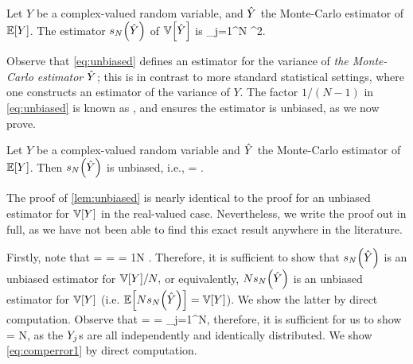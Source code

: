 Let $Y$ be a complex-valued random variable, and $\hat{Y}$ the Monte-Carlo estimator of $\EXP{Y}$. The estimator $\unbiased{\Yhat}{N}$ of $\VAR{\Yhat}$ is
\beq\label{eq:unbiased}
 \de {} \sum_{j=1}^N \abs{\Yj - \Yhat}^2.
\eeq
\ede

Observe that \cref{eq:unbiased} defines an estimator for the variance of \emph{the Monte-Carlo estimator $\hat{Y}$}; this is in contrast to more standard statistical settings, where one constructs an estimator of the variance of $Y$. The factor $1/(N-1)$ in \cref{eq:unbiased} is known as , and ensures the estimator is unbiased, as we now prove.

\label{lem:unbiased}
Let $Y$ be a complex-valued random variable and  $\hat{Y}$ the Monte-Carlo estimator of $\EXP{Y}$. Then $\unbiased{\Yhat}{N}$ is unbiased, i.e.,
\beqs
{} = \VAR{\Yhat}.
\eeqs
\ele

The proof of \cref{lem:unbiased} is nearly identical to the proof for an unbiased estimator for $\VAR{Y}$ in the real-valued case. Nevertheless, we write the proof out in full, as we have not been able to find this exact result anywhere in the literature.

Firstly, note that
\beqs
\VAR{\Yhat} =  =   = \frac1N .
\eeqs
Therefore, it is sufficient to show that $\unbiased{\Yhat}{N}$ is an unbiased estimator for $\VAR{Y}/N,$ or equivalently, $N\unbiased{\Yhat}{N}$ is an unbiased estimator for $\VAR{Y}$ (i.e. $\EXP{N\unbiased{\Yhat}{N}} = \VAR{Y}$). We show the latter by direct computation. Observe that
\beqs
{} =  =  \sum_{j=1}^N,
\eeqs
therefore, it is sufficient for us to show
\beq\label{eq:comperror1}
 = N,
\eeq
as the $Y_{j}$s are all independently and identically distributed. We show \cref{eq:comperror1} by direct computation.

